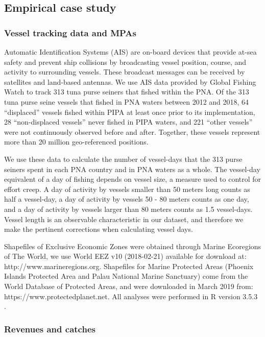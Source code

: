 \documentclass[12pt]{article}
\begin{document}
\subsection{Empirical case study}

\subsubsection{Vessel tracking data and MPAs}

Automatic Identification Systems (AIS) are on-board devices that provide at-sea safety and prevent ship collisions by broadcasting vessel position, course, and activity to surrounding vessels. These broadcast messages can be received by satellites and land-based antennas. We use AIS data provided by Global Fishing Watch \cite{kroodsma_2018} to track 313 tuna purse seiners that fished within the PNA. Of the 313 tuna purse seine vessels that fished in PNA waters between 2012 and 2018, 64 ``displaced'' vessels fished within PIPA at least once prior to its implementation, 28 ``non-displaced vessels'' never fished in PIPA waters, and  221 ``other vessels'' were not continuously observed before and after. Together, these vessels represent more than 20 million geo-referenced positions.

We use these data to calculate the number of vessel-days that the 313 purse seiners spent in each PNA country and in PNA waters as a whole. The vessel-day equivalent of a day of fishing depends on vessel size, a measure used to control for effort creep. A day of activity by vessels smaller than 50 meters long counts as half a vessel-day, a day of activity by vessels 50 - 80 meters counts as one day, and a day of activity by vessels larger than 80 meters counts as 1.5 vessel-days. Vessel length is an observable characteristic in our dataset, and therefore we make the pertinent corrections when calculating vessel days.

Shapefiles of Exclusive Economic Zones were obtained through Marine Ecoregions of The World, we use World EEZ v10 (2018-02-21) available for download at: http://www.marineregions.org. Shapefiles for Marine Protected Areas (Phoenix Islands Protected Area and Palau National Marine Sanctuary) come from the World Database of Protected Areas, and were downloaded in March 2019 from: https://www.protectedplanet.net. All analyses were performed in R version 3.5.3 \cite{rcore_2018}.

\subsubsection{Revenues and catches}
\end{document}
